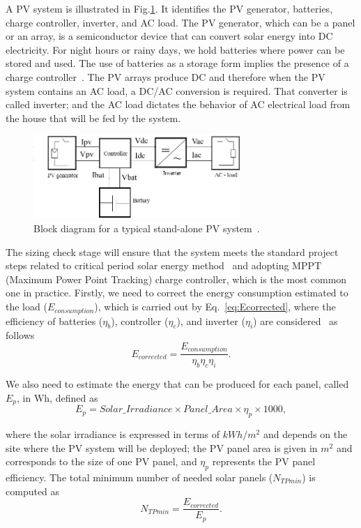 \documentclass[review]{elsarticle}
\begin{document}
A PV system is illustrated in Fig.\ref{fig:blockdiagram}. It identifies the PV generator, batteries, charge controller, inverter, and AC load. 
The PV generator, which can be a panel or an array, is a semiconductor device that can convert solar energy into DC electricity.  
For night hours or rainy days, we hold batteries where power can be stored and used. The use of batteries as a storage 
form implies the presence of a charge controller~\cite{Hansen}. The PV arrays produce DC and therefore when the PV system 
contains an AC load, a DC/AC conversion is required. That converter is called inverter; and the AC load dictates the behavior 
of AC electrical load from the house that will be fed by the system.
%
\begin{figure}[h]
\includegraphics[width=0.7\textwidth]{blockdiagramPVS2_rev}
\centering
\caption{Block diagram for a typical stand-alone PV system~\cite{Hansen}.}
\label{fig:blockdiagram} 
\end{figure}

The sizing check stage will ensure that the system meets the standard project steps related 
to critical period solar energy method~\cite{Pinho} and adopting MPPT (Maximum Power Point Tracking) charge controller,
which is the most common one in practice. Firstly, we need to correct the energy consumption estimated to the load 
($E_{consumption}$), which is carried out by Eq.~\eqref{eq:Ecorrected}, where the efficiency of batteries ($\eta_{b}$), 
controller ($\eta_{c}$), and inverter ($\eta_{i}$) are considered~\cite{Pinho} as follows
%
\begin{equation}
\label{eq:Ecorrected}
E_{corrected} = \dfrac{E_{consumption}}{\eta_{b} \eta_{c} \eta_{i} }.
\end{equation}

We also need to estimate the energy that can be produced for each panel, called $E_{p}$, in Wh, defined as
%
\begin{equation}
\label{eq:Ep}
E_{p} = Solar\_Irradiance \times Panel\_Area \times \eta_{p} \times 1000,
\end{equation}

\noindent where the solar irradiance is expressed in terms of $kWh/m^{2}$ and depends on the site where the PV system will be deployed; 
the PV panel area is given in $m^{2}$ and corresponds to the size of one PV panel, and $\eta_{p}$ represents the PV panel efficiency.
The total minimum number of needed solar panels ($N_{TPmin}$) is computed as
%
\begin{equation}
\label{eq:NTPmin}
N_{TPmin} = \dfrac{E_{corrected}}{E_{p}}.
\end{equation}
\end{document}
